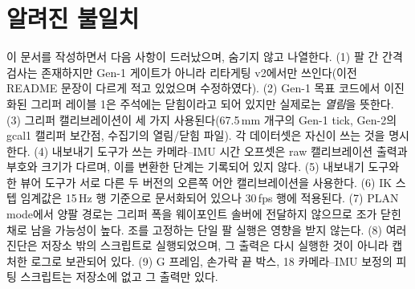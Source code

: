 \documentclass[conference,10pt]{IEEEtran}
\newcommand{\mm}{\,mm\xspace}
\begin{document}
\section{알려진 불일치}\label{m:sec:issues}
이 문서를 작성하면서 다음 사항이 드러났으며, 숨기지 않고 나열한다. (1) 팔 간 간격 검사는 존재하지만 Gen-1 게이트가 아니라 리타게팅
v2에서만 쓰인다(이전 README 문장이 다르게 적고 있었으며 수정하였다). (2) Gen-1 목표 코드에서 이진화된 그리퍼 레이블 1은 주석에는
닫힘이라고 되어 있지만 실제로는 \emph{열림}을 뜻한다. (3) 그리퍼 캘리브레이션이 세 가지 사용된다(67.5\mm{} 개구의 Gen-1 tick, Gen-2의
gcal1 캘리퍼 보간점, 수집기의 열림/닫힘 파일). 각 데이터셋은 자신이 쓰는 것을 명시한다. (4) 내보내기 도구가 쓰는 카메라--IMU 시간
오프셋은 raw 캘리브레이션 출력과 부호와 크기가 다르며, 이를 변환한 단계는 기록되어 있지 않다. (5) 내보내기 도구와 한 뷰어 도구가 서로
다른 두 버전의 오른쪽 어안 캘리브레이션을 사용한다. (6) IK 스텝 임계값은 15\,Hz 행 기준으로 문서화되어 있으나 30\,fps 행에 적용된다.
(7) PLAN mode에서 양팔 경로는 그리퍼 폭을 웨이포인트 솔버에 전달하지 않으므로 조가 닫힌 채로 남을 가능성이 높다. 조를 고정하는
단일 팔 실행은 영향을 받지 않는다. (8) 여러 진단은 저장소 밖의 스크립트로 실행되었으며, 그 출력은 다시 실행한 것이 아니라 캡처한
로그로 보관되어 있다. (9) G 프레임, 손가락 끝 박스, 18\textdegree{} 카메라--IMU 보정의 피팅 스크립트는 저장소에 없고 그 출력만 있다.
\clearpage\renewcommand{\refname}{참고문헌}
\label{part:refs}
\end{document}
